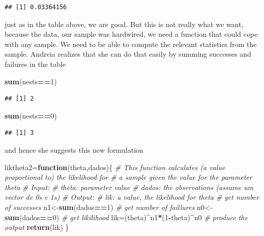 \documentclass[
]{book}
\newenvironment{Shaded}{\begin{snugshade}}{\end{snugshade}}
\newcommand{\CommentTok}[1]{\textcolor[rgb]{0.56,0.35,0.01}{\textit{#1}}}
\newcommand{\ControlFlowTok}[1]{\textcolor[rgb]{0.13,0.29,0.53}{\textbf{#1}}}
\newcommand{\DecValTok}[1]{\textcolor[rgb]{0.00,0.00,0.81}{#1}}
\newcommand{\FunctionTok}[1]{\textcolor[rgb]{0.13,0.29,0.53}{\textbf{#1}}}
\newcommand{\NormalTok}[1]{#1}
\newcommand{\OtherTok}[1]{\textcolor[rgb]{0.56,0.35,0.01}{#1}}
\newcommand{\SpecialCharTok}[1]{\textcolor[rgb]{0.81,0.36,0.00}{\textbf{#1}}}
\begin{document}
\begin{verbatim}
## [1] 0.03364156
\end{verbatim}

just as in the table above, we are good. But this is not really what we want, because the data, our sample was hardwired, we need a function that could cope with any sample. We need to be able to compute the relevant statistics from the sample. Andreia realizes that she can do that easily by summing successes and failures in the table

\begin{Shaded}
\begin{Highlighting}[]
\FunctionTok{sum}\NormalTok{(nests}\SpecialCharTok{==}\DecValTok{1}\NormalTok{)}
\end{Highlighting}
\end{Shaded}

\begin{verbatim}
## [1] 2
\end{verbatim}

\begin{Shaded}
\begin{Highlighting}[]
\FunctionTok{sum}\NormalTok{(nests}\SpecialCharTok{==}\DecValTok{0}\NormalTok{)}
\end{Highlighting}
\end{Shaded}

\begin{verbatim}
## [1] 3
\end{verbatim}

and hence she suggests this new formulation

\begin{Shaded}
\begin{Highlighting}[]
\NormalTok{liktheta2}\OtherTok{=}\ControlFlowTok{function}\NormalTok{(theta,dados)\{}
  \CommentTok{\# This function calculates (a value proportional to) the likelihood for }
  \CommentTok{\# a sample given the value for the parameter theta }
  \CommentTok{\# Input:}
  \CommentTok{\#       theta: parameter value}
  \CommentTok{\#       dados: the observations (assume um vector de 0\textquotesingle{}s e 1\textquotesingle{}s)}
  \CommentTok{\# Output:}
  \CommentTok{\#       lik: a value, the likelihood for theta}
  \CommentTok{\# get number of successes}
\NormalTok{  n1}\OtherTok{\textless{}{-}}\FunctionTok{sum}\NormalTok{(dados}\SpecialCharTok{==}\DecValTok{1}\NormalTok{)}
  \CommentTok{\# get number of faillures}
\NormalTok{  n0}\OtherTok{\textless{}{-}}\FunctionTok{sum}\NormalTok{(dados}\SpecialCharTok{==}\DecValTok{0}\NormalTok{)}
  \CommentTok{\# get likilihood}
\NormalTok{  lik}\OtherTok{=}\NormalTok{(theta)}\SpecialCharTok{\^{}}\NormalTok{n1}\SpecialCharTok{*}\NormalTok{(}\DecValTok{1}\SpecialCharTok{{-}}\NormalTok{theta)}\SpecialCharTok{\^{}}\NormalTok{n0}
  \CommentTok{\# produce the output}
  \FunctionTok{return}\NormalTok{(lik)}
\NormalTok{  \}}
\end{Highlighting}
\end{Shaded}
\end{document}
